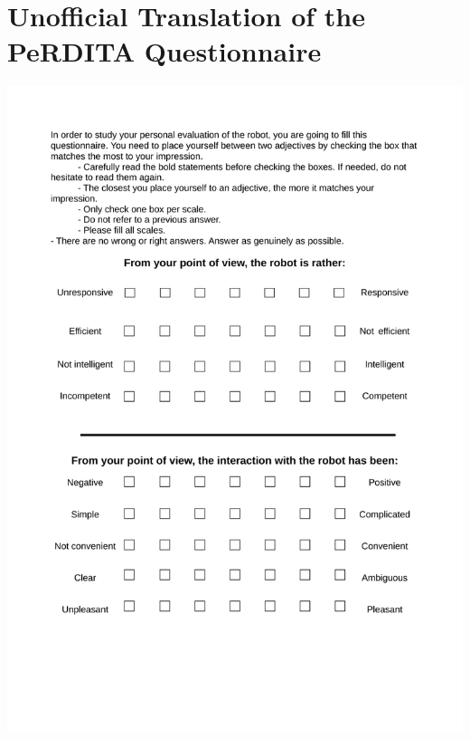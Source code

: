 \section{Unofficial Translation of the PeRDITA Questionnaire}
\begin{center}
\includegraphics[page=1, width=\textwidth]{Annexes/perdita_translation_en_thesis.pdf} 
\end{center}

